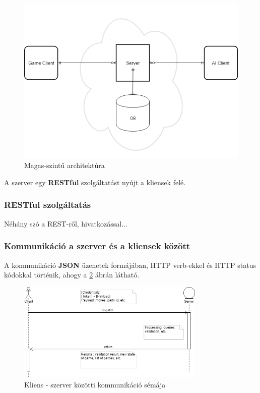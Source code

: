 \documentclass[twoside, a4paper, 12pt]{article}
\begin{document}
\begin{figure}[htbp]
	\centering
	\includegraphics[width=1.0\textwidth]{img/highLevelArchitecture.png}
	\caption{Magas-szintű architektúra}
	\label{fig:highLevelArchitecture}
\end{figure}

A szerver egy \textbf{RESTful} szolgáltatást nyújt a kliensek felé.

\subsubsection{RESTful szolgáltatás}
Néhány szó a REST-ről, hivatkozással...

\subsubsection{Kommunikáció a szerver és a kliensek között}
A kommunikáció \textbf{JSON} üzenetek formájában, HTTP verb-ekkel és HTTP status kódokkal történik, ahogy a \ref{fig:clientServerCommunication} ábrán látható.

\begin{figure}[htbp]
	\centering
	\includegraphics[width=0.8\textwidth]{img/clientServerCommunication.png}
	\caption{Kliens - szerver közötti kommunikáció sémája}
	\label{fig:clientServerCommunication}
\end{figure}
\end{document}

